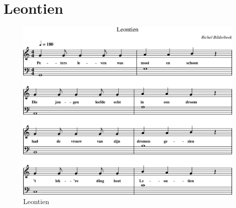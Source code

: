 \chapter{Leontien}



\begin{figure}[!htbp]
  \includegraphics[width=\textwidth,height=\textheight,keepaspectratio]{../songs/06_leontien.png}
  \caption{Leontien}
  \label{fig:06_leontien}
\end{figure}
